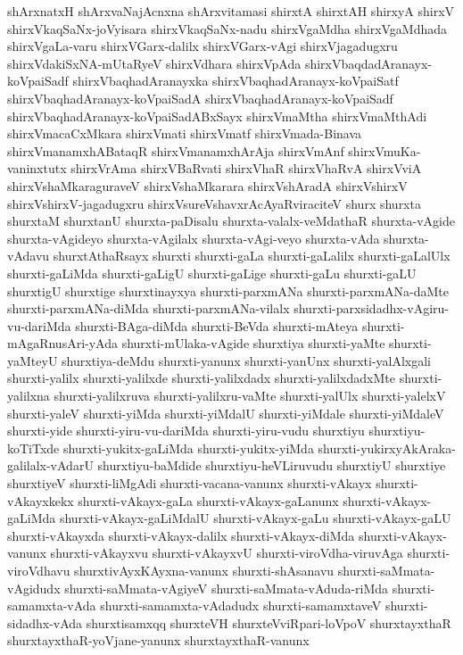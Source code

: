 {shArxnatxH
shArxvaNajAcnxna
shArxvitamasi
shirxtA
shirxtAH
shirxyA
shirxV
shirxVkaqSaNx-joVyisara
shirxVkaqSaNx-nadu
shirxVgaMdha
shirxVgaMdhada
shirxVgaLa-varu
shirxVGarx-dalilx
shirxVGarx-vAgi
shirxVjagadugxru
shirxVdakiSxNA-mUtaRyeV
shirxVdhara
shirxVpAda
shirxVbaqdadAranayx-koVpaiSadf
shirxVbaqhadAranayxka
shirxVbaqhadAranayx-koVpaiSatf
shirxVbaqhadAranayx-koVpaiSadA
shirxVbaqhadAranayx-koVpaiSadf
shirxVbaqhadAranayx-koVpaiSadABxSayx
shirxVmaMtha
shirxVmaMthAdi
shirxVmacaCxMkara
shirxVmati
shirxVmatf
shirxVmada-Binava
shirxVmanamxhABataqR
shirxVmanamxhArAja
shirxVmAnf
shirxVmuKa-vaninxtutx
shirxVrAma
shirxVBaRvati
shirxVhaR
shirxVhaRvA
shirxVviA
shirxVshaMkaraguraveV
shirxVshaMkarara
shirxVshAradA
shirxVshirxV
shirxVshirxV-jagadugxru
shirxVsureVshavxrAcAyaRviraciteV
shurx
shurxta
shurxtaM
shurxtanU
shurxta-paDisalu
shurxta-valalx-veMdathaR
shurxta-vAgide
shurxta-vAgideyo
shurxta-vAgilalx
shurxta-vAgi-veyo
shurxta-vAda
shurxta-vAdavu
shurxtAthaRsayx
shurxti
shurxti-gaLa
shurxti-gaLalilx
shurxti-gaLalUlx
shurxti-gaLiMda
shurxti-gaLigU
shurxti-gaLige
shurxti-gaLu
shurxti-gaLU
shurxtigU
shurxtige
shurxtinayxya
shurxti-parxmANa
shurxti-parxmANa-daMte
shurxti-parxmANa-diMda
shurxti-parxmANa-vilalx
shurxti-parxsidadhx-vAgiru-vu-dariMda
shurxti-BAga-diMda
shurxti-BeVda
shurxti-mAteya
shurxti-mAgaRnusAri-yAda
shurxti-mUlaka-vAgide
shurxtiya
shurxti-yaMte
shurxti-yaMteyU
shurxtiya-deMdu
shurxti-yanunx
shurxti-yanUnx
shurxti-yalAlxgali
shurxti-yalilx
shurxti-yalilxde
shurxti-yalilxdadx
shurxti-yalilxdadxMte
shurxti-yalilxna
shurxti-yalilxruva
shurxti-yalilxru-vaMte
shurxti-yalUlx
shurxti-yalelxV
shurxti-yaleV
shurxti-yiMda
shurxti-yiMdalU
shurxti-yiMdale
shurxti-yiMdaleV
shurxti-yide
shurxti-yiru-vu-dariMda
shurxti-yiru-vudu
shurxtiyu
shurxtiyu-koTiTxde
shurxti-yukitx-gaLiMda
shurxti-yukitx-yiMda
shurxti-yukirxyAkAraka-galilalx-vAdarU
shurxtiyu-baMdide
shurxtiyu-heVLiruvudu
shurxtiyU
shurxtiye
shurxtiyeV
shurxti-liMgAdi
shurxti-vacana-vanunx
shurxti-vAkayx
shurxti-vAkayxkekx
shurxti-vAkayx-gaLa
shurxti-vAkayx-gaLanunx
shurxti-vAkayx-gaLiMda
shurxti-vAkayx-gaLiMdalU
shurxti-vAkayx-gaLu
shurxti-vAkayx-gaLU
shurxti-vAkayxda
shurxti-vAkayx-dalilx
shurxti-vAkayx-diMda
shurxti-vAkayx-vanunx
shurxti-vAkayxvu
shurxti-vAkayxvU
shurxti-viroVdha-viruvAga
shurxti-viroVdhavu
shurxtivAyxKAyxna-vanunx
shurxti-shAsanavu
shurxti-saMmata-vAgidudx
shurxti-saMmata-vAgiyeV
shurxti-saMmata-vAduda-riMda
shurxti-samamxta-vAda
shurxti-samamxta-vAdadudx
shurxti-samamxtaveV
shurxti-sidadhx-vAda
shurxtisamxqq
shurxteVH
shurxteVviRpari-loVpoV
shurxtayxthaR
shurxtayxthaR-yoVjane-yanunx
shurxtayxthaR-vanunx
}
